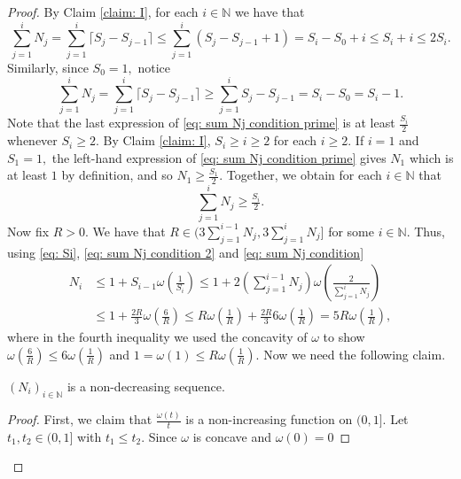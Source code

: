 \documentclass[10pt,a4paper]{amsart}
\newcommand{\N}{\mathbb{N}}
\begin{document}
\begin{proof}
    By Claim \ref{claim: I}, for each $i\in \N$ we have that
  \begin{equation} \label{eq: sum Nj condition 2}
        \sum_{j=1}^iN_j = \sum_{j=1}^i\lceil S_j-S_{j-1}\rceil \leq \sum_{j=1}^i (S_j-S_{j-1}+1) = S_i -S_0+i\leq S_i+i \leq 2S_i.
 \end{equation} Similarly, since $S_0 = 1,$ notice
 \begin{equation} \label{eq: sum Nj condition prime}
        \sum_{j=1}^iN_j = \sum_{j=1}^i\lceil S_j-S_{j-1}\rceil \geq \sum_{j=1}^i S_j-S_{j-1} = S_i -S_0
 = S_i -1.
 \end{equation} Note that the last expression of \eqref{eq: sum Nj condition prime} is at least $\frac{S_i}{2}$ whenever $S_i \geq 2.$ By Claim \ref{claim: I}, $S_i \geq i \geq 2$ for each $i \geq 2.$ If $i = 1$ and $S_1 =1,$ the left-hand expression of \eqref{eq: sum Nj condition prime} gives $N_1$ which is at least $1$ by definition, and so $N_1 \geq \frac{S_1}{2}.$ Together, we obtain for each $i \in \N$ that
 \begin{equation} \label{eq: sum Nj condition}
     \sum_{j=1}^i N_j \geq \tfrac{S_i}{2}.
 \end{equation}
  Now fix $R>0.$ We have that $R \in (3\sum_{j=1}^{i-1}N_j,3\sum_{j=1}^{i}N_j]$ for some $i \in \N.$ Thus, using \eqref{eq: Si}, \eqref{eq: sum Nj condition 2} and \eqref{eq: sum Nj condition}
    \begin{equation} \label{eq: 4max}
        \begin{split}
            N_i &\leq 1+S_{i-1}\omega\left(\tfrac{1}{S_i}\right) \leq 1+2\left(\sum_{j=1}^{i-1}N_j\right)\omega\left(\frac{2}{\sum_{j=1}^iN_j}\right)
             \\&\leq 1+\tfrac{2R}{3}\omega\left(\tfrac{6}{R}\right) \leq R\omega\left(\tfrac{1}{R}\right) +\tfrac{2R}{3}6\omega\left(\tfrac{1}{R}\right) = 5R\omega\left(\tfrac{1}{R}\right),
        \end{split}
    \end{equation} where in the fourth inequality we used the concavity of $\omega$ to show ${\omega(\frac{6}{R}) \leq 6\omega(\frac{1}{R})}$ and $1=\omega(1) \leq R\omega(\frac{1}{R}).$
    Now we need the following claim.
    \begin{claim} \label{claim: nondec}
        $(N_i)_{i \in \N}$ is a non-decreasing sequence.
    \end{claim}
    \begin{proof}
    First, we claim that $\frac{\omega(t)}{t}$ is a non-increasing function on $(0,1]$. Let $t_1,t_2 \in (0,1]$ with $t_1\leq t_2$. Since $\omega$ is concave and $\omega(0) = 0$

\end{proof}
\end{proof}
\end{document}

